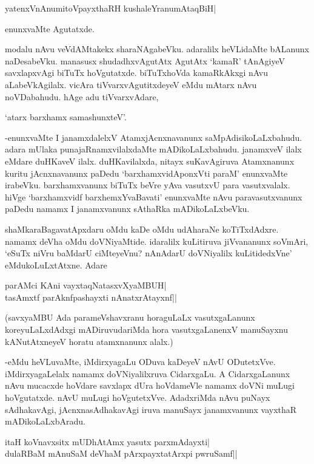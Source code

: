 \begin{shloka}
yatenxVnAnumitoVpayxthaRH kushaleYranumAtaqBiH|
\end{shloka}

enunxvaMte Agutatxde.

modalu nAvu veVdAMtakekx sharaNAgabeVku. adaralilx heVLidaMte bALanunx naDesabeVku. manasusx shudadhxvAgutAtx AgutAtx `kamaR' tAnAgiyeV savxlapxvAgi biTuTx hoVgutatxde. biTuTxhoVda kamaRkAkxgi nAvu aLabeVkAgilalx. vicAra tiVvarxvAgutitxdeyeV eMdu mAtarx nAvu noVDabahudu. hAge adu tiVvarxvAdare,

\begin{shloka}
`atarx barxhamx samashunxteV'.
\end{shloka}

-enunxvaMte I janamxdalelxV AtamxjAcnxnavanunx saMpAdisikoLaLxbahudu. adara mUlaka punajaRnamxvilalxdaMte mADikoLaLxbahudu. janamxveV ilalx eMdare duHKaveV ilalx. duHKavilalxda, nitayx suKavAgiruva Atamxnanunx kuritu jAcnxnavanunx paDedu `barxhamxvidAponxVti paraM' enunxvaMte irabeVku. barxhamxvanunx biTuTx beVre yAva vasutxvU para vasutxvalalx. hiVge `barxhamxvidf barxhemxYvaBavati' enunxvaMte nAvu paravasutxvanunx paDedu namamx I janamxvanunx sAthaRka mADikoLaLxbeVku.

shaMkaraBagavatApxdaru oMdu kaDe oMdu udAharaNe koTiTxdAdxre. namamx deVha oMdu doVNiyaMtide. idaralilx kuLitiruva jiVvananunx soVmAri, `eSuTx niVru baMdarU ciMteyeVnu? nAnAdarU doVNiyalilx kuLitidedxVne' eMdukoLuLxtAtxne. Adare

\begin{shloka}
parAMci KAni vayxtaqNatasxvXyaMBUH|\\
tasAmxtf parAknfpashayxti nAnatxrAtayxnf||
\end{shloka}

(savxyaMBU Ada parameVshavxranu horaguLaLx vasutxgaLanunx koreyuLaLxdAdxgi mADiruvudariMda hora vasutxgaLanenxV manuSayxnu kANutAtxneyeV horatu atamxnanunx alalx.)

-eMdu heVLuvaMte, iMdirxyagaLu ODuva kaDeyeV nAvU ODutetxVve. iMdirxyagaLelalx namamx doVNiyalilxruva CidarxgaLu. A CidarxgaLanunx nAvu mucacxde hoVdare savxlapx dUra hoVdameVle namamx doVNi muLugi hoVgutatxde. nAvU muLugi hoVgutetxVve. AdadxriMda nAvu puNayx sAdhakavAgi, jAcnxnasAdhakavAgi iruva manuSayx janamxvanunx vayxthaR mADikoLaLxbAradu.

\begin{shloka}
itaH koV\s navxsitx mUDhAtAmx yasutx parxmAdayxti|\\
dulaRBaM mAnuSaM deVhaM pArxpayxtatArxpi pwruSamf||
\end{shloka}

